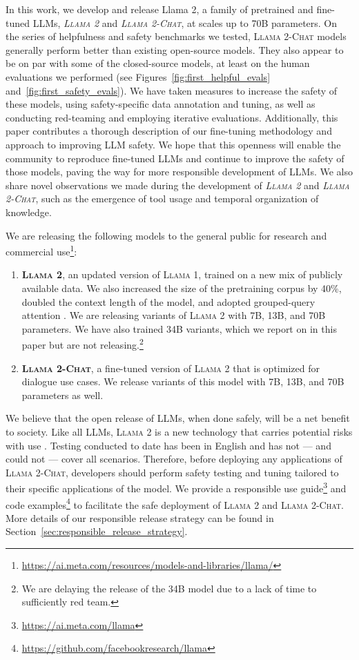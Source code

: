\documentclass{article}
\newcommand{\modelname}{\textsc{Llama 2-Chat}\xspace}
\newcommand{\anise}{\textsc{Llama 1}\xspace}
\newcommand{\cinnamon}{\textsc{Llama 2}\xspace}
\begin{document}
In this work, we develop and release Llama 2, a family of pretrained and fine-tuned LLMs, \textit{\cinnamon} and \textit{\modelname}, at scales up to 70B parameters. On the series of helpfulness and safety benchmarks we tested, \modelname models generally perform better than existing open-source models. They also appear to be on par with some of the closed-source models, at least on the human evaluations we performed (see Figures~\ref{fig:first_helpful_evals} and~\ref{fig:first_safety_evals}). We have taken measures to increase the safety of these models, using safety-specific data annotation and tuning, as well as conducting red-teaming and employing iterative evaluations. Additionally, this paper contributes a thorough description of our fine-tuning methodology and approach to improving LLM safety. We hope that this openness will enable the community to reproduce fine-tuned LLMs and continue to improve the safety of those models, paving the way for more responsible development of LLMs. We also share novel observations we made during the development of \textit{\cinnamon} and \textit{\modelname}, such as the emergence of tool usage and temporal organization of knowledge.

We are releasing the following models to the general public for research and commercial use\footnote{\url{https://ai.meta.com/resources/models-and-libraries/llama/}}:
\begin{enumerate}
  \item \textbf{\cinnamon{}}, an updated version of \anise{}, trained on a new mix of publicly available data. We also increased the size of the pretraining corpus by 40\%, doubled the context length of the model, and adopted grouped-query attention \citep{gqa2023}. We are releasing variants of \cinnamon with 7B, 13B, and 70B parameters. We have also trained 34B variants, which we report on in this paper but are not releasing.\footnote{We are delaying the release of the 34B model due to a lack of time to sufficiently red team.}

  \item \textbf{\modelname{}}, a fine-tuned version of \cinnamon{} that is optimized for dialogue use cases. We release variants of this model with 7B, 13B, and 70B parameters as well.
\end{enumerate}

We believe that the open release of LLMs, when done safely, will be a net benefit to society. Like all LLMs, \cinnamon is a new technology that carries potential risks with use \citep{bender2021dangers,weidinger2021ethical,solaiman2023evaluating}. Testing conducted to date has  been in English and has not — and could not — cover all scenarios.  Therefore, before deploying any applications of \modelname{}, developers should perform safety testing and tuning tailored to their specific applications of the model. We provide a responsible use guide\footnote{\url{https://ai.meta.com/llama}} and code examples\footnote{\url{https://github.com/facebookresearch/llama}} to facilitate the safe deployment of \cinnamon and \modelname. More details of our responsible release strategy can be found in Section~\ref{sec:responsible_release_strategy}.
\end{document}
